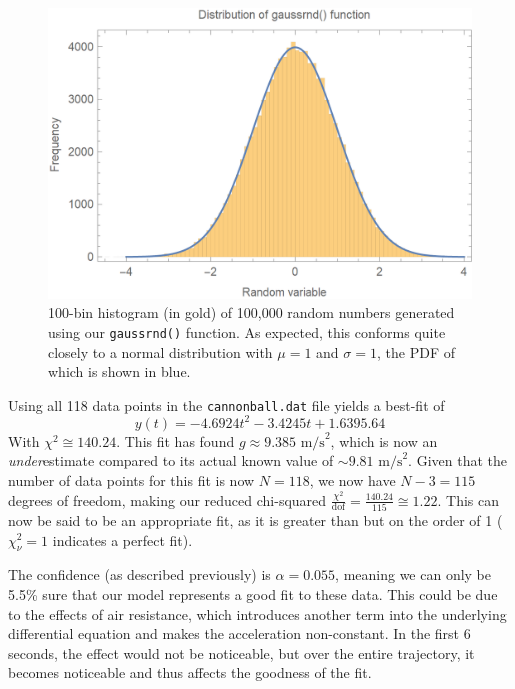 \documentclass{article}
\begin{document}
\begin{figure}[H]
    \centering
    \includegraphics[width=4.5in]{homework7/normal_dist.png}
    \caption{100-bin histogram (in gold) of 100,000 random numbers generated using our \texttt{gaussrnd()} function. As expected, this conforms quite closely to a normal distribution with $\mu=1$ and $\sigma=1$, the PDF of which is shown in blue.}
    \label{fig:gaussrnd}
\end{figure}

\bigskip
{}
\medskip

Using all 118 data points in the \texttt{cannonball.dat} file yields a best-fit of \begin{equation*}
    y(t) = -4.6924t^2 - 3.4245t + 1.6395.64
\end{equation*}
With $\chi^2 \cong 140.24$. This fit has found $g\approx9.385\text{ m/s}^2$, which is now an \emph{under}estimate compared to its actual known value of $\sim9.81\text{ m/s}^2$. Given that the number of data points for this fit is now $N=118$, we now have $N-3=115$ degrees of freedom, making our reduced chi-squared $\frac{\chi^2}{\text{dof}} = \frac{140.24}{115} \cong 1.22$. This can now be said to be an appropriate fit, as it is greater than but on the order of 1 ($\chi_\nu^2 = 1$ indicates a perfect fit).

The confidence (as described previously) is $\alpha=0.055$, meaning we can only be 5.5\% sure that our model represents a good fit to these data. This could be due to the effects of air resistance, which introduces another term into the underlying differential equation and makes the acceleration non-constant. In the first 6 seconds, the effect would not be noticeable, but over the entire trajectory, it becomes noticeable and thus affects the goodness of the fit.
\end{document}
